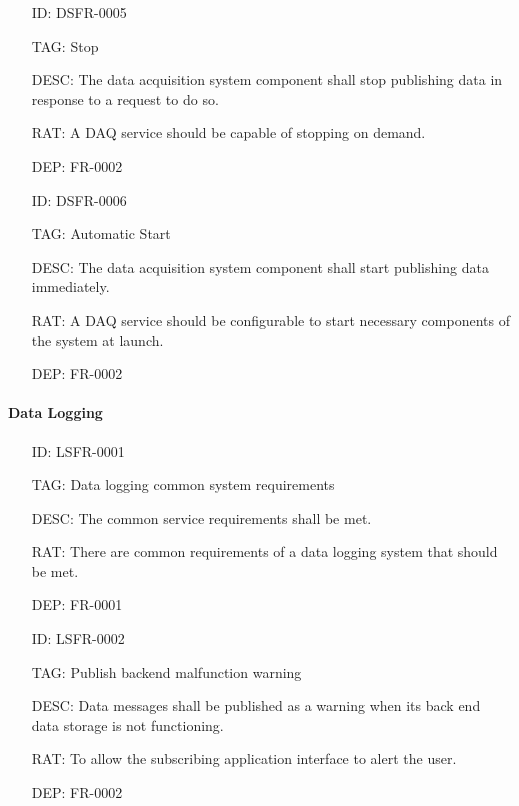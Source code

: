         \begin{itemize}
          \setlength{\itemindent}{.5in}
          \itemsep .15em
          \item[ID:] DSFR-0005
          \item[TAG:] Stop
          \item[DESC:] The data acquisition system component shall stop
            publishing data in response to a request to do so.
          \item[RAT:] A DAQ service should be capable of stopping on demand.
          \item[DEP:] FR-0002
        \end{itemize}

        \newpage

        \begin{itemize}
          \setlength{\itemindent}{.5in}
          \itemsep .15em
          \item[ID:] DSFR-0006
          \item[TAG:] Automatic Start
          \item[DESC:] The data acquisition system component shall start
            publishing data immediately.
          \item[RAT:] A DAQ service should be configurable to start necessary
            components of the system at launch.
          \item[DEP:] FR-0002
        \end{itemize}

      \paragraph{Data Logging}

        \begin{itemize}
          \setlength{\itemindent}{.5in}
          \itemsep .15em
          \item[ID:] LSFR-0001
          \item[TAG:] Data logging common system requirements
          \item[DESC:] The common service requirements shall be met.
          \item[RAT:] There are common requirements of a data logging system
            that should be met.
          \item[DEP:] FR-0001
        \end{itemize}

        \begin{itemize}
          \setlength{\itemindent}{.5in}
          \itemsep .15em
          \item[ID:] LSFR-0002
          \item[TAG:] Publish backend malfunction warning
          \item[DESC:] Data messages shall be published as a warning when its
            back end data storage is not functioning.
          \item[RAT:] To allow the subscribing application interface to alert
            the user.
          \item[DEP:] FR-0002
        \end{itemize}

